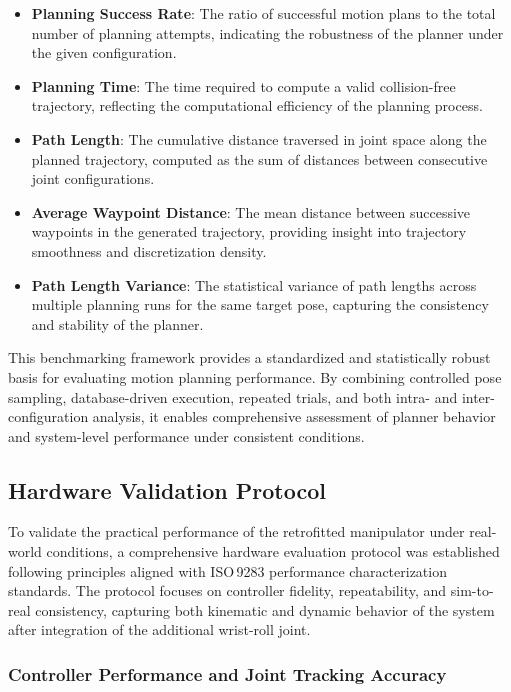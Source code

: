 \documentclass[conference]{IEEEtran}
\begin{document}
	\begin{itemize}
		\item \textbf{Planning Success Rate}: The ratio of successful motion plans to the total number of planning attempts, indicating the robustness of the planner under the given configuration.
		
		\item \textbf{Planning Time}: The time required to compute a valid collision-free trajectory, reflecting the computational efficiency of the planning process.
		
		\item \textbf{Path Length}: The cumulative distance traversed in joint space along the planned trajectory, computed as the sum of distances between consecutive joint configurations.
		
		\item \textbf{Average Waypoint Distance}: The mean distance between successive waypoints in the generated trajectory, providing insight into trajectory smoothness and discretization density.
		
		\item \textbf{Path Length Variance}: The statistical variance of path lengths across multiple planning runs for the same target pose, capturing the consistency and stability of the planner.
	\end{itemize}
	
	This benchmarking framework provides a standardized and statistically robust basis for evaluating motion planning performance. By combining controlled pose sampling, database-driven execution, repeated trials, and both intra- and inter-configuration analysis, it enables comprehensive assessment of planner behavior and system-level performance under consistent conditions.
	
	\subsection{Hardware Validation Protocol}
	
	To validate the practical performance of the retrofitted manipulator under real-world conditions, a comprehensive hardware evaluation protocol was established following principles aligned with ISO\,9283 performance characterization standards. The protocol focuses on controller fidelity, repeatability, and sim-to-real consistency, capturing both kinematic and dynamic behavior of the system after integration of the additional wrist-roll joint.
	
	\subsubsection{Controller Performance and Joint Tracking Accuracy}
	
\end{document}
